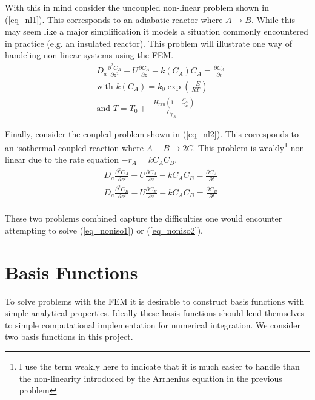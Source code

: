 \documentclass[11pt,fleqn]{article}
\theoremstyle{defstyle}
\begin{document}
With this in mind consider the uncoupled non-linear problem shown in (\ref{eq_nl1}). This corresponds to an adiabatic reactor where $A \rightarrow B$. While this may seem like a major simplification it models a situation commonly encountered in practice (e.g. an insulated reactor). This problem will illustrate one way of handeling non-linear systems using the FEM.
\begin{equation}
\begin{aligned}
&D_a \frac{\partial^2 C_A}{\partial z^2} - U \frac{\partial C_A}{\partial z} - k(C_A)
C_A = \frac{\partial C_A}{\partial t} \\
& \text{with }k(C_A) = k_0 \exp(\frac{-E}{RT}) \\
& \text{and } T = T_0 + \frac{-H_{rxn} (1-\frac{C_A}{C_{A0}})}{C_{p_A}}
\end{aligned}
\label{eq_nl1}
\end{equation}  

Finally, consider the coupled problem shown in (\ref{eq_nl2}). This corresponds to an isothermal coupled reaction where $A + B \rightarrow 2C$. This problem is weakly\footnote{I use the term weakly here to indicate that it is much easier to handle than the non-linearity introduced by the Arrhenius equation in the previous problem} non-linear due to the rate equation $-r_A = kC_AC_B$.
\begin{equation}
\begin{aligned}
&D_a \frac{\partial^2 C_A}{\partial z^2} - U \frac{\partial C_A}{\partial z} - kC_AC_B 
= \frac{\partial C_A}{\partial t} \\
&D_a \frac{\partial^2 C_B}{\partial z^2} - U \frac{\partial C_B}{\partial z} - kC_AC_B 
= \frac{\partial C_B}{\partial t} \\
\end{aligned}
\label{eq_nl2}
\end{equation}

These two problems combined capture the difficulties one would encounter attempting to solve (\ref{eq_noniso1}) or (\ref{eq_noniso2}).

\section{Basis Functions}
To solve problems with the FEM it is desirable to construct basis functions with simple analytical properties. Ideally these basis functions should lend themselves to simple computational implementation for numerical integration. We consider two basis functions in this project. 
\end{document}
